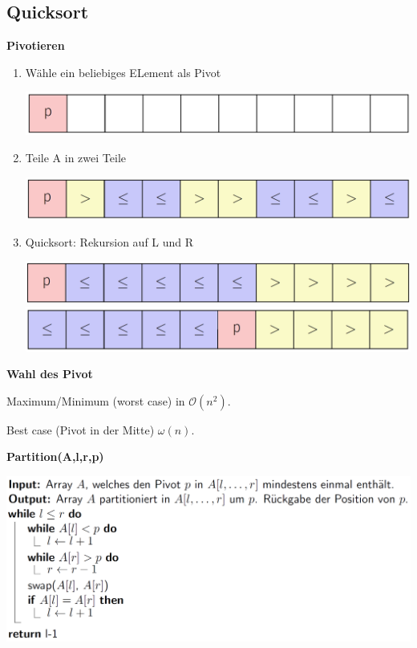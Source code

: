 \begin{sectionbox}
\subsection{Quicksort}\smallskip
\textbf{Pivotieren}\par
\begin{enumerate}
    \item Wähle ein beliebiges ELement als Pivot\par
    \includegraphics[width = 0.4\columnwidth]{../img/pivot1.png}
    \item Teile A in zwei Teile\par
    \includegraphics[width = 0.4\columnwidth]{../img/pivot2.png}
    \item Quicksort: Rekursion auf L und R\par
    \includegraphics[width = 0.4\columnwidth]{../img/pivot3.png}
    \includegraphics[width = 0.4\columnwidth]{../img/pivot4.png}
\end{enumerate}\smallskip
\textbf{Wahl des Pivot}\par
Maximum/Minimum (worst case) in $\mathcal{O}(n^{2})$.\par
Best case (Pivot in der Mitte) $\omega(n)$.\par\smallskip
\textbf{Partition(A,l,r,p)}\par
\includegraphics[width = \columnwidth]{../img/PartCode.png}
\par\smallskip


\end{sectionbox}
